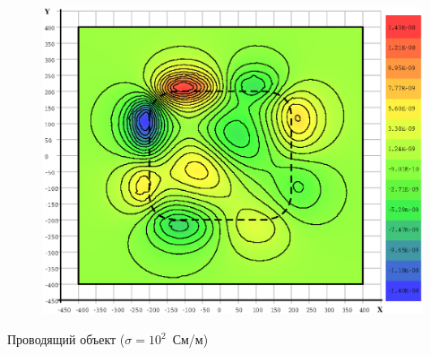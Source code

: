 \documentclass[aspectratio=43]{beamer}
\begin{document}
\begin{frame}
\begin{columns}[t,totalwidth=\linewidth]
\begin{column}{.5\linewidth}
\begin{figure}[H]
				\includegraphics[width=1.1\textwidth,height=1.1\textheight,keepaspectratio]{0_yes_z=-601_EzR.eps}
			\end{figure}
			\begin{center}
				\vspace{-1em}
				\tiny{Проводящий объект ($\sigma = 10^{2}$~См/м)}
			\end{center}
		\end{column}
	\end{columns}
\end{frame}

\end{document}
